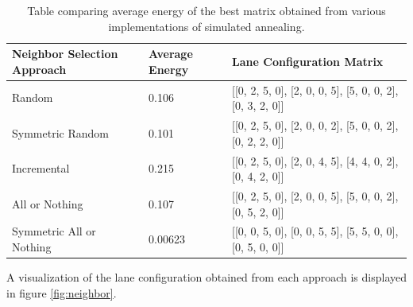 \documentclass[11pt]{article}
\begin{document}
\begin{table}[H]
\centering
\begin{tabular}{|l|l|l|}
\hline
Neighbor Selection Approach & Average Energy & Lane Configuration Matrix\\ \hline
Random& 0.106 &   [[0, 2, 5, 0], [2, 0, 0, 5], [5, 0, 0, 2], [0, 3, 2, 0]]\\ \hline
Symmetric Random &   0.101 &  [[0, 2, 5, 0], [2, 0, 0, 2], [5, 0, 0, 2], [0, 2, 2, 0]]\\ \hline
Incremental &  0.215 & [[0, 2, 5, 0], [2, 0, 4, 5], [4, 4, 0, 2], [0, 4, 2, 0]]\\ \hline
All or Nothing &  0.107 &  [[0, 2, 5, 0], [2, 0, 0, 5], [5, 0, 0, 2], [0, 5, 2, 0]]\\ \hline
Symmetric All or Nothing &   0.00623 &  [[0, 0, 5, 0], [0, 0, 5, 5], [5, 5, 0, 0], [0, 5, 0, 0]]\\ \hline
\end{tabular}
\caption{\label{table:neighbor} Table comparing average energy of the best matrix obtained from various implementations of simulated annealing.}
\end{table}
A visualization of the lane configuration obtained from each approach is displayed in figure \ref{fig:neighbor}.
\end{document}
